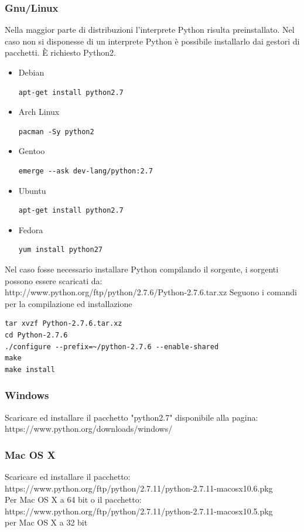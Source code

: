 \documentclass[12pt]{scrartcl}
\begin{document}
    \subsubsection{Gnu/Linux}
    Nella maggior parte di distribuzioni l'interprete Python risulta preinstallato.
    Nel caso non si disponesse di un interprete Python \`e possibile installarlo dai
    gestori di pacchetti. \`E richiesto Python2.
    \begin{itemize}
        \item{Debian}
            \begin{verbatim}
apt-get install python2.7
            \end{verbatim}
    \item{Arch Linux}
            \begin{verbatim}
pacman -Sy python2
            \end{verbatim}
        \item{Gentoo}
            \begin{verbatim}
emerge --ask dev-lang/python:2.7
        \end{verbatim}
    \item{Ubuntu}
            \begin{verbatim}
apt-get install python2.7
            \end{verbatim}
    \item{Fedora}
            \begin{verbatim}
yum install python27
            \end{verbatim}
    \end{itemize}
    Nel caso fosse necessario installare Python compilando il sorgente, i sorgenti possono
    essere scaricati da: \\
    http://www.python.org/ftp/python/2.7.6/Python-2.7.6.tar.xz
    Seguono i comandi per la compilazione ed installazione
    \begin{verbatim}
tar xvzf Python-2.7.6.tar.xz
cd Python-2.7.6
./configure --prefix=~/python-2.7.6 --enable-shared
make
make install
    \end{verbatim}
    \subsubsection{Windows}
    Scaricare ed installare il pacchetto "python2.7" disponibile alla pagina:\\
    https://www.python.org/downloads/windows/
    \subsubsection{Mac OS X}
    Scaricare ed installare il pacchetto:\\
    https://www.python.org/ftp/python/2.7.11/python-2.7.11-macosx10.6.pkg\\
    Per Mac OS X a 64 bit
    o il pacchetto:\\
    https://www.python.org/ftp/python/2.7.11/python-2.7.11-macosx10.5.pkg\\
    per Mac OS X a 32 bit
\end{document}
